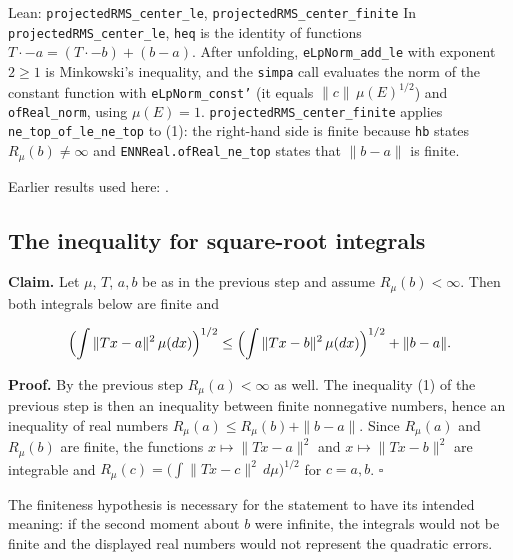 \documentclass[11pt,a4paper]{report}
\begin{document}
\begin{leanbox}{Lean: \texttt{projectedRMS\_\allowbreak{}center\_\allowbreak{}le}, \texttt{projectedRMS\_\allowbreak{}center\_\allowbreak{}finite}}
In \texttt{projected\allowbreak{}RMS\_\allowbreak{}center\_\allowbreak{}le}, \texttt{heq} is the identity of functions \(T\cdot-a=(T\cdot-b)+(b-a)\). After unfolding, \texttt{e\allowbreak{}Lp\allowbreak{}Norm\_\allowbreak{}add\_\allowbreak{}le} with exponent \(2\ge1\) is Minkowski's inequality, and the \texttt{simpa} call evaluates the norm of the constant function with \texttt{e\allowbreak{}Lp\allowbreak{}Norm\_\allowbreak{}const'} (it equals \(\|c\|\,\mu(E)^{1/2}\)) and \texttt{of\allowbreak{}Real\_\allowbreak{}norm}, using \(\mu(E)=1\). \texttt{projected\allowbreak{}RMS\_\allowbreak{}center\_\allowbreak{}finite} applies \texttt{ne\_\allowbreak{}top\_\allowbreak{}of\_\allowbreak{}le\_\allowbreak{}ne\_\allowbreak{}top} to (1): the right-hand side is finite because \texttt{hb} states \(R_\mu(b)\ne\infty\) and \texttt{ENNReal.\allowbreak{}of\allowbreak{}Real\_\allowbreak{}ne\_\allowbreak{}top} states that \(\|b-a\|\) is finite.
\end{leanbox}


Earlier results used here: \cite[Section~3.48.1]{LangevinLean2026ULASC}.
\subsection{\texorpdfstring{The inequality for square-root integrals}{The inequality for square-root integrals}}
\label{report-step-ProximalLangevin-ProjectionCenter-lean-2}


\textbf{Claim.} Let \(\mu\), \(T\), \(a,b\) be as in the previous step and assume \(R_\mu(b)<\infty\). Then both integrals below are finite and


\[\Bigl(\int\|Tx-a\|^2\,\mu(dx)\Bigr)^{1/2}\le\Bigl(\int\|Tx-b\|^2\,\mu(dx)\Bigr)^{1/2}+\|b-a\| .\]


\textbf{Proof.} By the previous step \(R_\mu(a)<\infty\) as well. The inequality (1) of the previous step is then an inequality between finite nonnegative numbers, hence an inequality of real numbers \(R_\mu(a)\le R_\mu(b)+\|b-a\|\). Since \(R_\mu(a)\) and \(R_\mu(b)\) are finite, the functions \(x\mapsto\|Tx-a\|^2\) and \(x\mapsto\|Tx-b\|^2\) are integrable and \(R_\mu(c)=\bigl(\int\|Tx-c\|^2\,d\mu\bigr)^{1/2}\) for \(c=a,b\). \(\square\)




The finiteness hypothesis is necessary for the statement to have its intended meaning: if the second moment about \(b\) were infinite, the integrals would not be finite and the displayed real numbers would not represent the quadratic errors.
\end{document}
